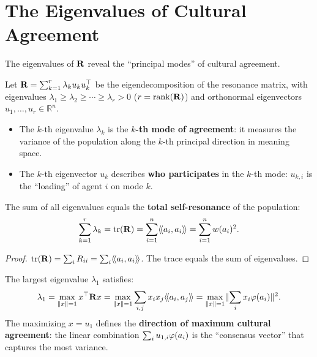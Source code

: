 \section{The Eigenvalues of Cultural Agreement}

The eigenvalues of $\mathbf{R}$ reveal the ``principal modes'' of cultural agreement.

\begin{definition}
\label{def:spectral-decomposition}
Let $\mathbf{R} = \sum_{k=1}^r \lambda_k u_k u_k^\top$ be the eigendecomposition
of the resonance matrix, with eigenvalues $\lambda_1 \geq \lambda_2 \geq \cdots
\geq \lambda_r > 0$ ($r = \operatorname{rank}(\mathbf{R})$) and orthonormal
eigenvectors $u_1, \ldots, u_r \in \mathbb{R}^n$.

\begin{itemize}
\item The $k$-th eigenvalue $\lambda_k$ is the \textbf{$k$-th mode of
agreement}: it measures the variance of the population along the $k$-th
principal direction in meaning space.
\item The $k$-th eigenvector $u_k$ describes \textbf{who participates} in the
$k$-th mode: $u_{k,i}$ is the ``loading'' of agent $i$ on mode $k$.
\end{itemize}
\end{definition}

\begin{theorem}
\label{thm:trace}
The sum of all eigenvalues equals the \textbf{total self-resonance} of the
population:
\[
  \sum_{k=1}^r \lambda_k = \operatorname{tr}(\mathbf{R}) = \sum_{i=1}^n
  \langle\!\langle a_i, a_i \rangle\!\rangle = \sum_{i=1}^n w(a_i)^2.
\]
\end{theorem}

\begin{proof}
$\operatorname{tr}(\mathbf{R}) = \sum_i R_{ii} = \sum_i \langle\!\langle a_i, a_i \rangle\!\rangle$. The trace
equals the sum of eigenvalues.
\end{proof}

\begin{theorem}
\label{thm:largest-eigenvalue}
The largest eigenvalue $\lambda_1$ satisfies:
\[
  \lambda_1 = \max_{\lVert x \rVert = 1} x^\top \mathbf{R} x
  = \max_{\lVert x \rVert = 1} \sum_{i,j} x_i x_j \langle\!\langle a_i, a_j \rangle\!\rangle
  = \max_{\lVert x \rVert = 1} \lVert \sum_i x_i \varphi(a_i) \rVert^2.
\]
The maximizing $x = u_1$ defines the \textbf{direction of maximum cultural
agreement}: the linear combination $\sum_i u_{1,i} \varphi(a_i)$ is the
``consensus vector'' that captures the most variance.
\end{theorem}

